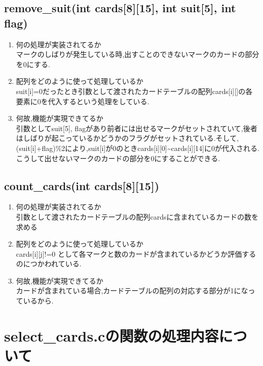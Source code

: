 \documentclass{jsarticle}
\begin{document}
\subsection{remove\_suit(int cards[8][15], int suit[5], int flag)}
\begin{enumerate}
  \item 何の処理が実装されてるか\\
  マークのしばりが発生している時,出すことのできないマークのカードの部分を0にする.
  \item 配列をどのように使って処理しているか\\
  suit[i]=0だったとき引数として渡されたカードテーブルの配列cards[i][]の各要素に0を代入するという処理をしている.
  \item 何故,機能が実現できてるか\\
  引数としてsuit[5], flagがあり前者には出せるマークがセットされていて,後者はしばりが起こっているかどうかのフラグがセットされている.そして,(suit[i]+flag)\%2により,suit[i]が0のときcards[i][0]\textasciitilde  cards[i][14]に0が代入される.こうして出せないマークのカードの部分を0にすることができる.

\end{enumerate}

\subsection{count\_cards(int cards[8][15])}
\begin{enumerate}
  \item 何の処理が実装されてるか\\
  引数として渡されたカードテーブルの配列cardsに含まれているカードの数を求める
  \item 配列をどのように使って処理しているか\\
  cards[i][j]!=0 として各マークと数のカードが含まれているかどうか評価するのにつかわれている.
  \item 何故,機能が実現できてるか\\
  カードが含まれている場合,カードテーブルの配列の対応する部分が1になっているから.
\end{enumerate}

\section{select\_cards.cの関数の処理内容について}
\end{document}
